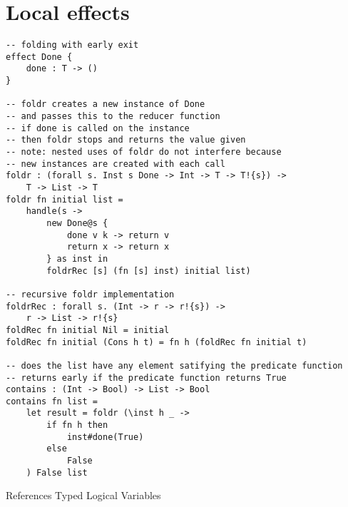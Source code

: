 \section{Local effects}
\begin{verbatim}
-- folding with early exit
effect Done {
	done : T -> ()
}

-- foldr creates a new instance of Done
-- and passes this to the reducer function
-- if done is called on the instance
-- then foldr stops and returns the value given
-- note: nested uses of foldr do not interfere because
-- new instances are created with each call
foldr : (forall s. Inst s Done -> Int -> T -> T!{s}) ->
	T -> List -> T
foldr fn initial list =
	handle(s ->
		new Done@s {
			done v k -> return v
			return x -> return x
		} as inst in
		foldrRec [s] (fn [s] inst) initial list)

-- recursive foldr implementation
foldrRec : forall s. (Int -> r -> r!{s}) ->
	r -> List -> r!{s}
foldRec fn initial Nil = initial
foldRec fn initial (Cons h t) = fn h (foldRec fn initial t)

-- does the list have any element satifying the predicate function
-- returns early if the predicate function returns True
contains : (Int -> Bool) -> List -> Bool
contains fn list =
	let result = foldr (\inst h _ ->
		if fn h then
			inst#done(True)
		else
			False
	) False list
\end{verbatim}

References Typed Logical Variables\cite{typedlogic}
